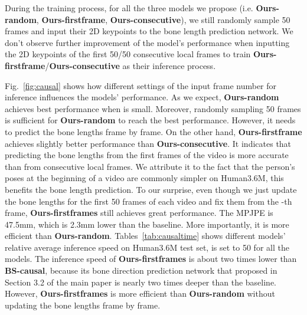 \documentclass[journal]{IEEEtran}
\begin{document}
\begin{table}[htbp]
  \small\centering
  \caption{\label{tab:causaltime} Relative average real-time inference speed on all the videos of Human3.6M test set.}
  \begin{threeparttable}
  \end{threeparttable}
  
\end{table}During the training process, for all the three models we propose (i.e. \textbf{Ours-random}, \textbf{Ours-firstframe}, \textbf{Ours-consecutive}), we still randomly sample 50 frames and input their 2D keypoints to the bone length prediction network. We don't observe further improvement of the model's performance when inputting the 2D keypoints of the first 50/50 consecutive local frames to train \textbf{Ours-firstframe}/\textbf{Ours-consecutive} as their inference process.


Fig.~\ref{fig:causal} shows how different settings of the input frame number  for inference influences the models' performance. As we expect, \textbf{Ours-random} achieves best performance when  is small. Moreover, randomly sampling 50 frames is sufficient for \textbf{Ours-random} to reach the best performance. However, it needs to predict the bone lengths frame by frame. On the other hand, \textbf{Ours-firstframe} achieves slightly better performance than \textbf{Ours-consecutive}. It indicates that predicting the bone lengths from the first frames of the video is more accurate than from consecutive local frames. We attribute it to the fact that the person's poses at the beginning of a video are commonly simpler on Human3.6M, this benefits the bone length prediction. To our surprise, even though we just update the bone lengths for the first 50 frames of each video and fix them from the -th frame, \textbf{Ours-firstframes} still achieves great performance. The MPJPE is 47.5mm, which is 2.3mm lower than the baseline. More importantly, it is more efficient than \textbf{Ours-random}. Tables~\ref{tab:causaltime} shows different models' relative average inference speed on Human3.6M test set,  is set to 50 for all the models. The inference speed of \textbf{Ours-firstframes} is about two times lower than \textbf{BS-causal}, because its bone direction prediction network that proposed in Section 3.2 of the main paper is nearly two times deeper than the baseline. However, \textbf{Ours-firstframes} is more efficient than \textbf{Ours-random} without updating the bone lengths frame by frame. 
\end{document}
